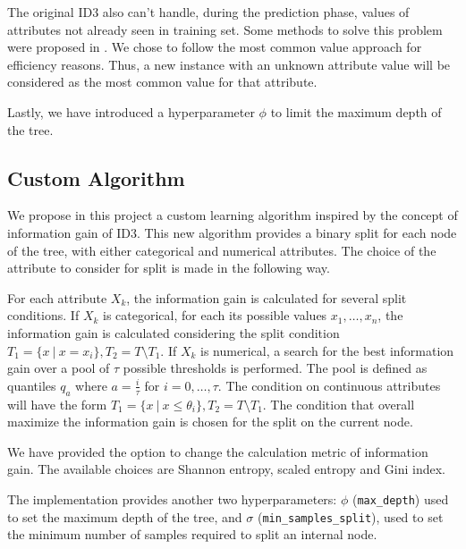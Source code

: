 \documentclass[12pt]{article}
\begin{document}
The original ID3 also can't handle, during the prediction phase, values of attributes not already seen in training set.
Some methods to solve this problem were proposed in \cite{ID3}. We chose to follow the most common value approach for efficiency reasons. Thus, a new instance with an unknown attribute value will be considered as the most common value for that attribute.

Lastly, we have introduced a hyperparameter $\phi$ to limit the maximum depth of the tree.

\subsection{Custom Algorithm}
We propose in this project a custom learning algorithm inspired by the concept of information gain of ID3.
This new algorithm provides a binary split for each node of the tree, with either categorical and numerical attributes.
The choice of the attribute to consider for split is made in the following way.

For each attribute $X_k$, the information gain is calculated for several split conditions. 
%
If $X_k$ is categorical, for each its possible values $x_1, \dots, x_n$, the information gain is calculated considering the split condition $T_1 = \{x \ | \ x = x_i\}, T_2 = T \setminus T_1$.
%
If $X_k$ is numerical, a search for the best information gain over a pool of $\tau$ possible thresholds is performed.
The pool is defined as quantiles $q_a$ where $a = \frac i \tau$ for $i = 0, \dots, \tau$.
The condition on continuous attributes will have the form $T_1 = \{x \ | \ x \le \theta_i \}, T_2 = T \setminus T_1$.
%
The condition that overall maximize the information gain is chosen for the split on the current node.

We have provided the option to change the calculation metric of information gain.
The available choices are Shannon entropy, scaled entropy and Gini index.

The implementation provides another two hyperparameters: $\phi$ (\texttt{max\_depth}) used to set the maximum depth of the tree, and $\sigma$ (\texttt{min\_samples\_split}), used to set the minimum number of samples required to split an internal node.
\end{document}
